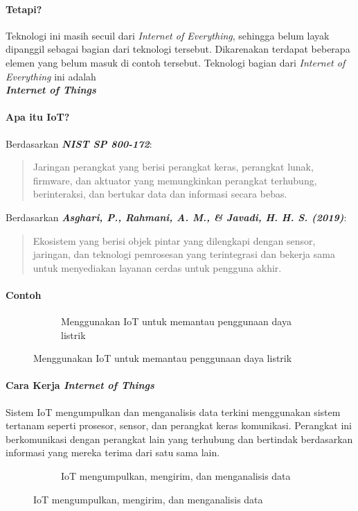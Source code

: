 \begin{frame}{\insertsectionhead}
	\framesubtitle{Tetapi?}
	\justifying
	\centering
	Teknologi ini masih secuil dari \textit{Internet of Everything}, sehingga belum layak dipanggil sebagai bagian dari teknologi tersebut. Dikarenakan terdapat beberapa elemen yang belum masuk di contoh tersebut.
	\vfill
	Teknologi bagian dari \textit{Internet of Everything} ini adalah \\
	\textbf{\textit{\large Internet of Things}}
\end{frame}

\begin{frame}{\insertsectionhead}
	\framesubtitle{Apa itu IoT?}
	\justifying
	Berdasarkan \textbf{\textit{NIST SP 800-172}}:
	\vfill
	\begin{quote}
		Jaringan perangkat yang berisi perangkat keras, perangkat lunak, firmware, dan aktuator yang memungkinkan perangkat terhubung, berinteraksi, dan bertukar data dan informasi secara bebas.
	\end{quote}
	\vfill
	Berdasarkan \textbf{\textit{Asghari, P., Rahmani, A. M., \& Javadi, H. H. S. (2019)}}:
	\vfill
	\begin{quote}
		Ekosistem yang berisi objek pintar yang dilengkapi dengan sensor, jaringan, dan teknologi pemrosesan yang terintegrasi dan bekerja sama untuk menyediakan layanan cerdas untuk pengguna akhir.
	\end{quote}
\end{frame}

\begin{frame}{\insertsectionhead}
	\framesubtitle{Contoh}
	\justifying
	\begin{figure}[ht!]
		\begin{subfigure}[b]{0.6\textwidth}
			\caption*{Menggunakan IoT untuk memantau penggunaan daya listrik}
		\end{subfigure}
	\end{figure}
\end{frame}

\begin{frame}[fragile=singleslide]{\insertsectionhead}
	\framesubtitle{Cara Kerja \textit{Internet of Things}}
	\justifying
	Sistem IoT mengumpulkan dan menganalisis data terkini menggunakan sistem tertanam seperti prosesor, sensor, dan perangkat keras komunikasi. Perangkat ini berkomunikasi dengan perangkat lain yang terhubung dan bertindak berdasarkan informasi yang mereka terima dari satu sama lain.
	\begin{figure}[ht!]
		\begin{subfigure}[b]{0.6\textwidth}
			\caption*{IoT mengumpulkan, mengirim, dan menganalisis data}
		\end{subfigure}
	\end{figure}
\end{frame}

